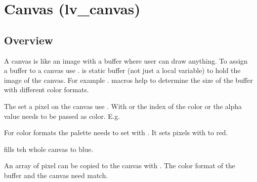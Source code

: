 \documentclass[letterpaper,10pt,english]{sphinxmanual}
\begin{document}
\section{Canvas (lv\_canvas)}
\label{\detokenize{object-types/canvas:canvas-lv-canvas}}\label{\detokenize{object-types/canvas::doc}}

\subsection{Overview}
\label{\detokenize{object-types/canvas:overview}}
A canvas is like an image with a buffer where user can draw anything.
To assign a buffer to a canvas use .  is static buffer (not just a local variable) to hold the image of the canvas. For example
.  macros help to determine the size of the buffer with different color formats.

The set a pixel on the canvas use . With  or  the index of the color or the alpha value needs to be passed as color. E.g. 

For  color formats the palette needs to set with  . It sets pixels with  to red.

 fills teh whole canvas to blue.

An array of pixel can be copied to the canvas with . The color format of the buffer and the canvas need match.
\end{document}
